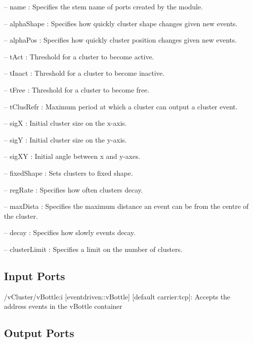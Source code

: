 \begin{DoxyItemize}
\item -- name \+: Specifies the stem name of ports created by the module.
\item -- alpha\+Shape \+: Specifies how quickly cluster shape changes given new events.
\item -- alpha\+Pos \+: Specifies how quickly cluster position changes given new events.
\item -- t\+Act \+: Threshold for a cluster to become active.
\item -- t\+Inact \+: Threshold for a cluster to become inactive.
\item -- t\+Free \+: Threshold for a cluster to become free.
\item -- t\+Clus\+Refr \+: Maximum period at which a cluster can output a cluster event.
\item -- sigX \+: Initial cluster size on the x-\/axis.
\item -- sigY \+: Initial cluster size on the y-\/axis.
\item -- sig\+XY \+: Initial angle between x and y-\/axes.
\item -- fixed\+Shape \+: Sets clusters to fixed shape.
\item -- reg\+Rate \+: Specifies how often clusters decay.
\item -- max\+Dista \+: Specifies the maximum distance an event can be from the centre of the cluster.
\item -- decay \+: Specifies how slowly events decay.
\item -- cluster\+Limit \+: Specifies a limit on the number of clusters. 
\end{DoxyItemize}\hypertarget{group__zynqGrabber_inputports_sec}{}\subsection{Input Ports}\label{group__zynqGrabber_inputports_sec}

\begin{DoxyItemize}
\item /v\+Cluster/v\+Bottle\+:i \mbox{[}eventdriven\+::v\+Bottle\mbox{]} \mbox{[}default carrier\+:tcp\mbox{]}\+: Accepts the address events in the v\+Bottle container
\end{DoxyItemize}\hypertarget{group__zynqGrabber_outputports_sec}{}\subsection{Output Ports}\label{group__zynqGrabber_outputports_sec}

